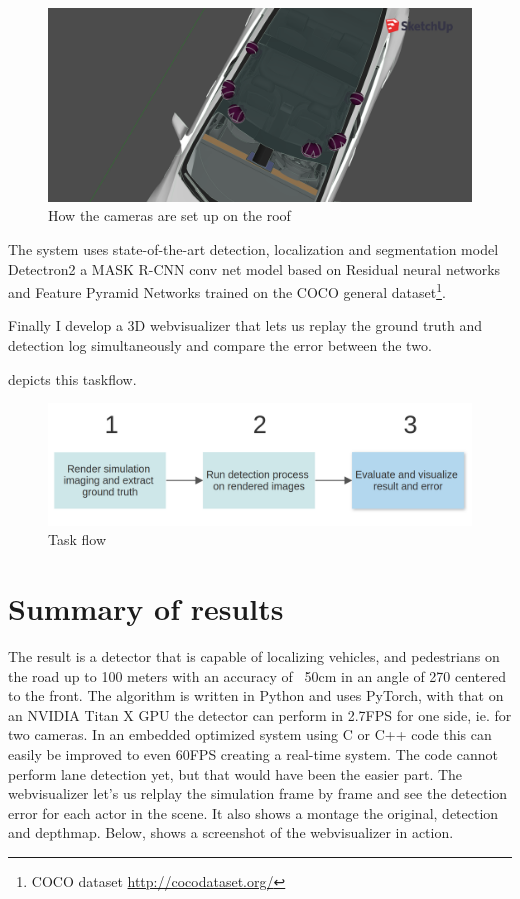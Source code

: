 \begin{figure}[!ht]
    \centering
    \includegraphics[width=150mm, keepaspectratio]{figures/3dmodel2.png}
    \caption{How the cameras are set up on the roof}
    \label{fig:3dmodel2}
\end{figure}

The system uses state-of-the-art detection, localization and segmentation model
Detectron2 \cite{wu2019detectron2} a MASK R-CNN conv net model based on Residual
neural networks and Feature Pyramid Networks trained on the COCO general
dataset\footnote{COCO dataset \url{http://cocodataset.org/}}.

Finally I develop a 3D webvisualizer that lets us replay the ground truth and
detection log simultaneously and compare the error between the two.

 depicts this taskflow.

\begin{figure}[!ht]
    \centering
    \includegraphics[width=150mm, keepaspectratio]{figures/flowchart.png}
    \caption{Task flow}
    \label{fig:flow}
\end{figure}

\section{Summary of results}

The result is a detector that is capable of localizing vehicles, and pedestrians
on the road up to 100 meters with an accuracy of ~50cm in an angle of 270\degree
centered to the front. The algorithm is written in Python and uses PyTorch, with that on
an NVIDIA Titan X GPU the detector can perform in 2.7FPS for one side, ie. for
two cameras. In an embedded optimized system using C or C++ code this can easily
be improved to even 60FPS creating a real-time system. The code cannot perform
lane detection yet, but that would have been the easier part. The webvisualizer
let's us relplay the simulation frame by frame and see the detection error for
each actor in the scene. It also shows a montage the original, detection and
depthmap. Below,  shows a screenshot of the webvisualizer
in action.

